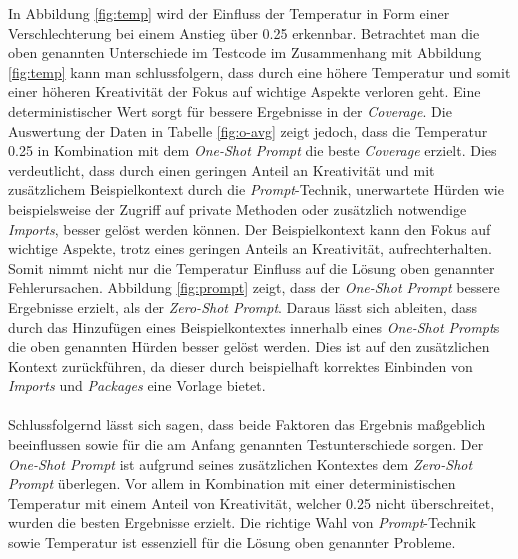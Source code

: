 In Abbildung \ref{fig:temp} wird der Einfluss der Temperatur in Form einer Verschlechterung bei einem Anstieg über 0.25 erkennbar. Betrachtet man die oben genannten Unterschiede im Testcode im Zusammenhang mit Abbildung \ref{fig:temp} kann man schlussfolgern, dass durch eine höhere Temperatur und somit einer höheren Kreativität der Fokus auf wichtige Aspekte verloren geht. Eine deterministischer Wert sorgt für bessere Ergebnisse in der \textit{Coverage}. Die Auswertung der Daten in Tabelle \ref{fig:o-avg} zeigt jedoch, dass die Temperatur 0.25 in Kombination mit dem \textit{One-Shot Prompt} die beste \textit{Coverage} erzielt. Dies verdeutlicht, dass durch einen geringen Anteil an Kreativität und mit zusätzlichem Beispielkontext durch die \textit{Prompt}-Technik, unerwartete Hürden wie beispielsweise der Zugriff auf private Methoden oder zusätzlich notwendige \textit{Imports}, besser gelöst werden können. Der Beispielkontext kann den Fokus auf wichtige Aspekte, trotz eines geringen Anteils an Kreativität, aufrechterhalten.\\
Somit nimmt nicht nur die Temperatur Einfluss auf die Lösung oben genannter Fehlerursachen. Abbildung \ref{fig:prompt} zeigt, dass der \textit{One-Shot Prompt} bessere Ergebnisse erzielt, als der \textit{Zero-Shot Prompt}. Daraus lässt sich ableiten, dass durch das Hinzufügen eines Beispielkontextes innerhalb eines \textit{One-Shot Prompt}s die oben genannten Hürden besser gelöst werden. Dies ist auf den zusätzlichen Kontext zurückführen, da dieser durch beispielhaft korrektes Einbinden von \textit{Imports} und \textit{Packages} eine Vorlage bietet.\\\\
Schlussfolgernd lässt sich sagen, dass beide Faktoren das Ergebnis maßgeblich beeinflussen sowie für die am Anfang genannten Testunterschiede sorgen. Der \textit{One-Shot Prompt} ist aufgrund seines zusätzlichen Kontextes dem \textit{Zero-Shot Prompt} überlegen. Vor allem in Kombination mit einer deterministischen Temperatur mit einem Anteil von Kreativität, welcher 0.25 nicht überschreitet, wurden die besten Ergebnisse erzielt. Die richtige Wahl von \textit{Prompt}-Technik sowie Temperatur ist essenziell für die Lösung oben genannter Probleme.

